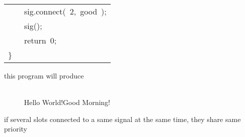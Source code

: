 \documentclass[9pt,onside,a4paper]{article}
\newcommand{\hlstd}[1]{\textcolor[rgb]{0.2,0,0.4}{#1}}
\newcommand{\hlnum}[1]{\textcolor[rgb]{0.2,0.73,0.02}{#1}}
\newcommand{\hlopt}[1]{\textcolor[rgb]{0.33,0.33,0.33}{#1}}
\newcommand{\hllin}[1]{\textcolor[rgb]{0.6,0.6,0.6}{#1}}
\newcommand{\hlkwa}[1]{\textcolor[rgb]{1,0.19,0.19}{#1}}
\newcommand{\hlkwd}[1]{\textcolor[rgb]{0.82,0.11,0.93}{#1}}
\begin{document}
\begin{center}
\begin{xtabular}{||l||}
\hlstd{}\hlstd{\ \ \ \ }\hlstd{sig}\hlopt{.}\hlstd{}\hlkwd{connect}\hlstd{}\hlopt{(\ }\hlstd{}\hlnum{2}\hlstd{}\hlopt{,\ }\hlstd{good\ }\hlopt{);}\hspace*{\fill}\\
\hlstd{}\hlstd{\ \ \ \ }\hlstd{}\hlkwd{sig}\hlstd{}\hlopt{();}\hspace*{\fill}\\
\hlstd{}\hlstd{\ \ \ \ }\hlstd{}\hlkwa{return\ }\hlstd{}\hlnum{0}\hlstd{}\hlopt{;}\hspace*{\fill}\\
\hlstd{}\hlopt{\}}\hlstd{}\hspace*{\fill}\\
\hline
\end{xtabular}
\end{center}
\normalfont
\normalsize

this program will produce
\begin{shaded}
{\small
\ttfamily
~\\
\hllin{\ \ \ \ \ }         Hello World!Good Morning! \\
\normalfont
}
\end{shaded}


if several slots connected to a same signal at the same time, they share same priority \\
\end{document}
